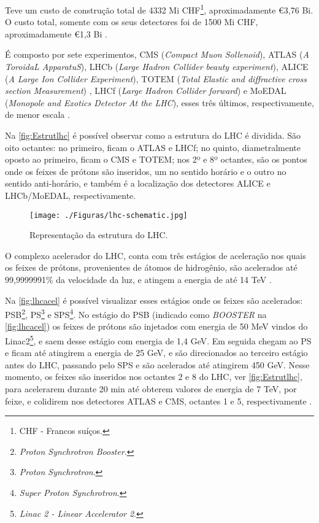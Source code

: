 Teve um custo de construção total de 4332 Mi CHF\footnote{CHF - Francos suíços.}, aproximadamente \euro 3,76 Bi. O custo total, somente com os seus detectores foi de 1500 Mi CHF, aproximadamente \euro 1,3 Bi  \cite{cern2017}.

É composto por sete experimentos, CMS (\textit{Compact Muon Sollenoid}), ATLAS (\textit{A ToroidaL ApparatuS}), LHCb (\textit{Large Hadron Collider beauty experiment}),  ALICE (\textit{A Large Ion Collider Experiment}), TOTEM (\textit{Total Elastic and diffractive cross section Measurement}) , LHCf (\textit{Large Hadron Collider forward}) e MoEDAL (\textit{Monopole and Exotics Detector At the LHC}), esses três últimos, respectivamente, de menor escala \cite{tcc:werner2011}. 

Na \autoref{fig:Estrutlhc} é possível observar como a estrutura do LHC é dividida. São oito octantes: no primeiro, ficam o ATLAS e LHCf; no quinto, diametralmente oposto ao primeiro, ficam o CMS e TOTEM; nos 2º e 8º octantes,  são os pontos onde os feixes de prótons são inseridos, um no sentido horário e o outro no sentido anti-horário, e também é a localização dos detectores ALICE e LHCb/MoEDAL, respectivamente.

\begin{figure}[H]
	\begin{center}
		\caption{Representação da estrutura do LHC.}
		\texttt{[image: ./Figuras/lhc-schematic.jpg]}
		\label{fig:Estrutlhc}
	\end{center}
\end{figure}

O complexo acelerador do LHC, conta com três estágios de aceleração nos quais os feixes de prótons, provenientes de átomos de hidrogênio,  são acelerados até 99,9999991\% da velocidade da luz, e atingem a energia de até 14 TeV \cite[p 5]{cern2017}. 


Na \autoref{fig:lhcacel} é possível visualizar esses estágios onde os feixes são acelerados: PSB\footnote{\textit{Proton Synchrotron Booster}.}, PS\footnote{\textit{Proton Synchrotron}.} e SPS\footnote{\textit{Super Proton Synchrotron}.}. No estágio do PSB (indicado como \textit{BOOSTER} na \autoref{fig:lhcacel}) os feixes de prótons são injetados com energia de 50 MeV vindos do Linac2\footnote{\textit{Linac 2 - Linear Accelerator 2}.}, e saem desse estágio com energia de 1,4 GeV. Em seguida chegam ao PS e ficam até atingirem a energia de 25 GeV, e são direcionados ao terceiro estágio antes do LHC, passando pelo SPS e são acelerados até atingirem 450 GeV. Nesse momento, os feixes são inseridos nos octantes 2 e 8  do LHC, ver \autoref{fig:Estrutlhc}, para acelerarem durante 20 min até obterem valores de energia de 7 TeV, por feixe, e colidirem nos detectores ATLAS e CMS, octantes 1 e 5, respectivamente \cite{cern2017}.


